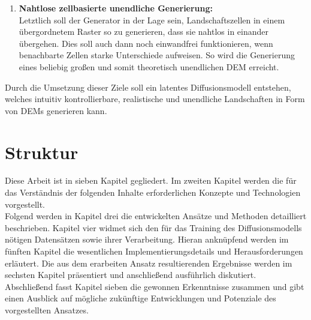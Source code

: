 \begin{enumerate}
    \item \textbf {Nahtlose zellbasierte unendliche Generierung:} \\
    Letztlich soll der Generator in der Lage sein, Landschaftszellen in einem übergordnetem Raster so zu generieren, dass sie nahtlos in einander übergehen. Dies soll auch dann noch einwandfrei funktionieren, wenn benachbarte Zellen starke Unterschiede aufweisen. So wird die Generierung eines beliebig großen und somit theoretisch unendlichen \ac{DEM} erreicht.
     
\end{enumerate}

Durch die Umsetzung dieser Ziele soll ein latentes Diffusionsmodell entstehen, welches intuitiv kontrollierbare, realistische und unendliche Landschaften in Form von \ac{DEM}s generieren kann.

\clearpage

\section{Struktur}

Diese Arbeit ist in sieben Kapitel gegliedert. Im zweiten Kapitel werden die für das Verständnis der folgenden Inhalte erforderlichen Konzepte und Technologien vorgestellt. \\
Folgend werden in Kapitel drei die entwickelten Ansätze und Methoden detailliert beschrieben. Kapitel vier widmet sich den für das Training des Diffusionsmodells nötigen Datensätzen sowie ihrer Verarbeitung. Hieran anknüpfend werden im fünften Kapitel die wesentlichen Implementierungsdetails und Herausforderungen erläutert. Die aus dem erarbeiten Ansatz resultierenden Ergebnisse werden im sechsten Kapitel präsentiert und anschließend ausführlich diskutiert. \\
Abschließend fasst Kapitel sieben die gewonnen Erkenntnisse zusammen und gibt einen Ausblick auf mögliche zukünftige Entwicklungen und Potenziale des vorgestellten Ansatzes.
